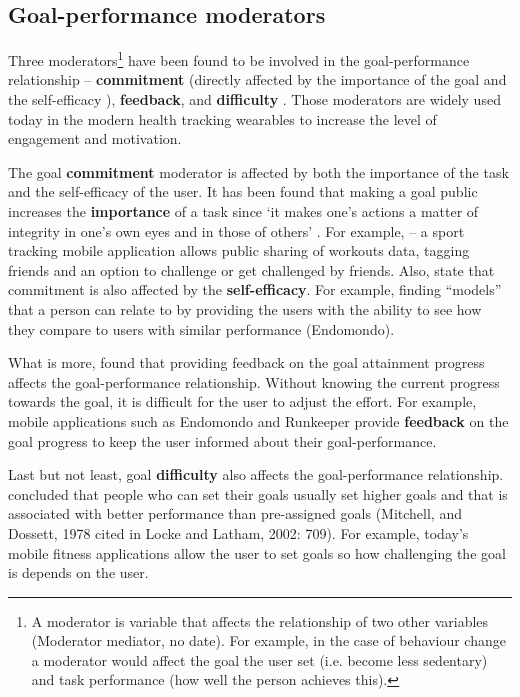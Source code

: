     \subsection{Goal-performance moderators}
    Three moderators\footnote{A moderator is variable that affects the relationship of two other variables (Moderator mediator, no date). For example, in the case of behaviour change a moderator would affect the goal the user set (i.e. become less sedentary) and task performance (how well the person achieves this).} have been found to be involved in the goal-performance relationship – \textbf{commitment} (directly affected by the importance of the goal and the self-efficacy ), \textbf{feedback}, and \textbf{difficulty} \citep[707]{locke2002}. Those moderators are widely used today in the modern health tracking wearables to increase the level of engagement and motivation.
    
    The goal \textbf{commitment} moderator is affected by both the importance of the task and the self-efficacy of the user. It has been found that making a goal public increases the \textbf{importance} of a task since ‘it makes one’s actions a matter of integrity in one’s own eyes and in those of others’ \citep[707]{locke2002}. For example, \citet[]{endomondo2016} – a sport tracking mobile application allows public sharing of workouts data, tagging friends and an option to challenge or get challenged by friends. Also, \citet[708]{locke2002} state that commitment is also affected by the \textbf{self-efficacy}. For example, finding “models” that a person can relate to by providing the users with the ability to see how they compare to users with similar performance (Endomondo).
    
    What is more, \citet[708]{locke2002} found that providing feedback on the goal attainment progress affects the goal-performance relationship. Without knowing the current progress towards the goal, it is difficult for the user to adjust the effort. For example, mobile applications such as Endomondo and Runkeeper \citep{fitnesskeeper2016} provide \textbf{feedback} on the goal progress to keep the user informed about their goal-performance.
    
    Last but not least, goal \textbf{difficulty} also affects the goal-performance relationship. \citet[709]{locke2002} concluded that people who can set their goals usually set higher goals and that is associated with better performance than pre-assigned goals (Mitchell, and Dossett, 1978 cited in Locke and Latham, 2002: 709). For example, today’s mobile fitness applications allow the user to set goals \citep{fitnesskeeper2016,endomondo2016} so how challenging the goal is depends on the user.

